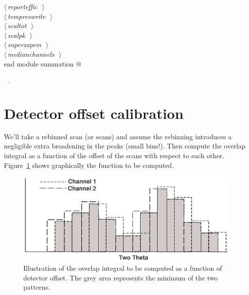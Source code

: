 \documentclass[10pt,a4paper,notitlepage]{article}
\begin{document}
\begin{flushleft}
\begin{minipage}{\linewidth}
\begin{list}{}{}
\mbox{}\verb@@\hbox{$\langle\,${\it reporteffic}\nobreak\ {\footnotesize {}}$\,\rangle$}\verb@@\\
\mbox{}\verb@@\hbox{$\langle\,${\it tempreswrite}\nobreak\ {\footnotesize {}}$\,\rangle$}\verb@@\\
\mbox{}\verb@@\hbox{$\langle\,${\it scaltot}\nobreak\ {\footnotesize {}}$\,\rangle$}\verb@@\\
\mbox{}\verb@@\hbox{$\langle\,${\it scalpk}\nobreak\ {\footnotesize {}}$\,\rangle$}\verb@@\\
\mbox{}\verb@@\hbox{$\langle\,${\it superzapem}\nobreak\ {\footnotesize {}}$\,\rangle$}\verb@@\\
\mbox{}\verb@@\hbox{$\langle\,${\it medianchannels}\nobreak\ {\footnotesize {}}$\,\rangle$}\verb@@\\
\mbox{}\verb@      end module summation                                                   @{\NWsep}
\end{list}
\vspace{-1.5ex}
\footnotesize
\begin{list}{}{\setlength{\itemsep}{-\parsep}\setlength{\itemindent}{-\leftmargin}}
\item \NWtxtMacroRefIn\ .

\item{}
\end{list}
\end{minipage}\vspace{4ex}
\end{flushleft}
\section{Detector offset calibration}

We'll take a rebinned scan (or scans) and assume the rebinning introduces a 
negligible extra broadening in the peaks (small bins!). 
Then compute the overlap integral as a function of the offset
of the scans with respect to each other. 
Figure~\ref{fig:offset} shows graphically
the function to be computed. 
\begin{figure}[tb]
  \centering
  \includegraphics{offset.eps}
  \caption{Illustration of the overlap integral to be computed as a
  function of detector offset. The grey area represents the minimum of the 
  two patterns.}
  \label{fig:offset}
\end{figure}
\end{document}
